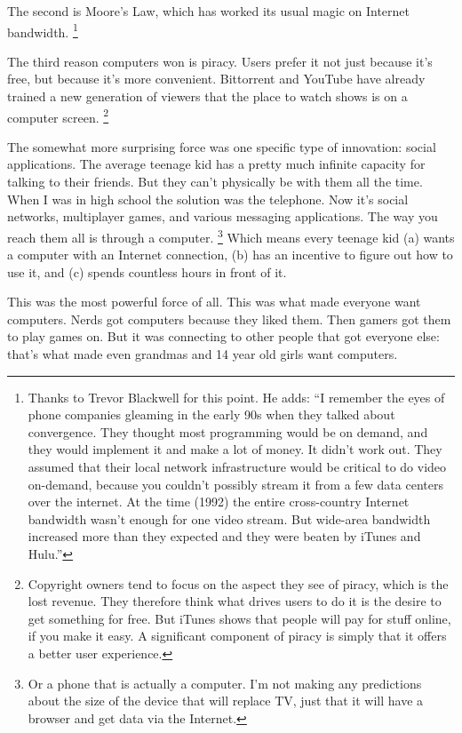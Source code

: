 \documentclass[12pt]{book}
\begin{document}
The second is Moore's Law, which has worked its usual magic on Internet
bandwidth. \footnote{Thanks to Trevor Blackwell for this point. He adds: ``I remember
the eyes of phone companies gleaming in the early 90s when they talked
about convergence. They thought most programming would be on demand, and
they would implement it and make a lot of money. It didn't work out.
They assumed that their local network infrastructure would be critical
to do video on-demand, because you couldn't possibly stream it from a
few data centers over the internet. At the time (1992) the entire
cross-country Internet bandwidth wasn't enough for one video stream. But
wide-area bandwidth increased more than they expected and they were
beaten by iTunes and Hulu.''}

The third reason computers won is piracy. Users prefer it not just
because it's free, but because it's more convenient. Bittorrent and
YouTube have already trained a new generation of viewers that the place
to watch shows is on a computer screen. \footnote{Copyright owners tend to focus on the aspect they see of piracy,
which is the lost revenue. They therefore think what drives users to do
it is the desire to get something for free. But iTunes shows that people
will pay for stuff online, if you make it easy. A significant component
of piracy is simply that it offers a better user experience.}

The somewhat more surprising force was one specific type of innovation:
social applications. The average teenage kid has a pretty much infinite
capacity for talking to their friends. But they can't physically be with
them all the time. When I was in high school the solution was the
telephone. Now it's social networks, multiplayer games, and various
messaging applications. The way you reach them all is through a
computer. \footnote{Or a phone that is actually a computer. I'm not making any
predictions about the size of the device that will replace TV, just that
it will have a browser and get data via the Internet.} Which means every teenage kid (a)
wants a computer with an Internet connection, (b) has an incentive to
figure out how to use it, and (c) spends countless hours in front of it.

This was the most powerful force of all. This was what made everyone
want computers. Nerds got computers because they liked them. Then gamers
got them to play games on. But it was connecting to other people that
got everyone else: that's what made even grandmas and 14 year old girls
want computers.
\end{document}
